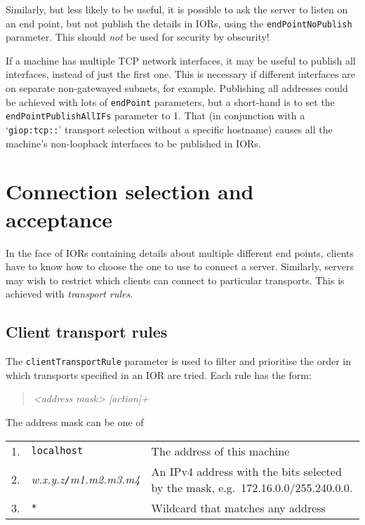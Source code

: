 \documentclass[11pt,twoside,a4paper]{book}
\newcommand{\code}[1]{\texttt{#1}}
\newcommand{\term}[1]{\textit{#1}}
\begin{document}
Similarly, but less likely to be useful, it is possible to ask the
server to listen on an end point, but not publish the details in IORs,
using the \code{endPointNoPublish} parameter. This should \emph{not}
be used for security by obscurity!

If a machine has multiple TCP network interfaces, it may be useful to
publish all interfaces, instead of just the first one. This is
necessary if different interfaces are on separate non-gatewayed
subnets, for example. Publishing all addresses could be achieved with
lots of \code{endPoint} parameters, but a short-hand is to set the
\code{endPointPublishAllIFs} parameter to 1. That (in conjunction with
a `\code{giop:tcp::}' transport selection without a specific hostname)
causes all the machine's non-loopback interfaces to be published in
IORs.



\section{Connection selection and acceptance}

In the face of IORs containing details about multiple different end
points, clients have to know how to choose the one to use to connect a
server. Similarly, servers may wish to restrict which clients can
connect to particular transports. This is achieved with
\term{transport rules}.


\subsection{Client transport rules}
\label{sec:clientRule}

The \code{clientTransportRule} parameter is used to filter and
prioritise the order in which transports specified in an IOR are
tried. Each rule has the form:

\begin{quote}
\textit{<address mask> [action]+}
\end{quote}

\noindent The address mask can be one of

\vspace{\baselineskip}

\begin{tabular}{llp{}}
1. & \code{localhost} & The address of this machine\\

2. & \textit{w.x.y.z}\code{/}\textit{m1.m2.m3.m4} & An IPv4 address
     with the bits selected by the mask, e.g.\
     172.16.0.0/255.240.0.0.\\

3. & \code{*} & Wildcard that matches any address\\
\end{tabular}
\end{document}
